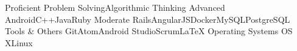 \begin{cvskills}
  \cvskill
    {Proficient}
    {Problem Solving{\dotsep}Algorithmic Thinking}
  \cvskill
    {Advanced}
    {Android{\dotsep}C++{\dotsep}Java{\dotsep}Ruby}
  \cvskill
    {Moderate}
    {Rails{\dotsep}AngularJS{\dotsep}Docker{\dotsep}MySQL{\dotsep}PostgreSQL}
  \cvskill
    {Tools \& Others}
    {Git{\dotsep}Atom{\dotsep}Android Studio{\dotsep}Scrum{\dotsep}\LaTeX}
  \cvskill
    {Operating Systems}
    {OS X{\dotsep}Linux}
\end{cvskills}
